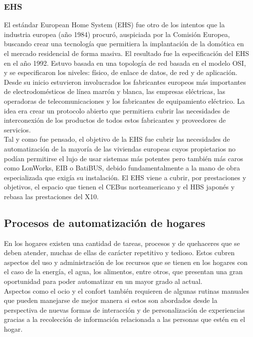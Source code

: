 \subsubsection{EHS}
El estándar European Home System (EHS) fue otro de los intentos que la industria europea (año 1984) procuró, auspiciada por la Comisión Europea, buscando  crear una tecnología que permitiera la implantación de la domótica en el mercado residencial de forma masiva. El resultado fue la especificación del EHS en el año 1992. Estuvo basada en una topología de red basada en el modelo OSI, y se especificaron los niveles: físico, de enlace de datos, de red y de aplicación.\\

Desde su inicio estuvieron involucrados los fabricantes europeos más importantes de electrodomésticos de línea marrón y blanca, las empresas eléctricas, las operadoras de telecomunicaciones y los fabricantes de equipamiento eléctrico. La idea era crear un protocolo abierto que permitiera cubrir las necesidades de interconexión de los productos de todos estos fabricantes y proveedores de servicios.\\

Tal y como fue pensado, el objetivo de la EHS fue cubrir las necesidades de automatización de la mayoría de las viviendas europeas cuyos propietarios no podían permitirse el lujo de usar sistemas más potentes pero también más caros como LonWorks, EIB o BatiBUS, debido fundamentalmente a la mano de obra especializada que exigía su instalación. El EHS viene a cubrir, por prestaciones y objetivos, el espacio que tienen el CEBus norteamericano y el HBS japonés y rebasa las prestaciones del X10.\cite{iecor}

\subsection{Procesos de automatización de hogares}
En los hogares existen una cantidad de tareas, procesos y de quehaceres que se deben atender, muchas de ellas de carácter repetitivo y tedioso. Estos cubren aspectos del uso y administración de los recursos que se tienen en los hogares con el caso de la energía, el agua, los alimentos, entre otros, que presentan una gran oportunidad para poder automatizar en un mayor grado al actual.\\

Aspectos como el ocio y el confort también requieren de algunas rutinas manuales que pueden manejarse de mejor manera si estos son abordados desde la perspectiva de nuevas formas de interacción y de personalización de experiencias gracias a la recolección de información relacionada a las personas que estén en el hogar.\\

